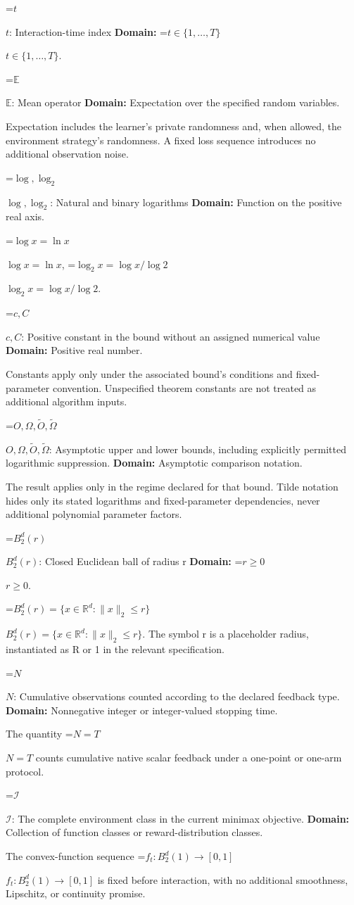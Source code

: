 \documentclass[10pt,a4paper]{article}
\newcommand{\AtlasMath}[1]{\par\begingroup\centering\setbox0=\hbox{$\displaystyle #1$}\ifdim\wd0>1.4\linewidth\typeout{ATLAS WIDE FORMULA: \the\wd0}\fi\ifdim\wd0>\linewidth\resizebox{\linewidth}{!}{\box0}\else\box0\fi\par\endgroup}
\newcommand{\AtlasInlineMath}[1]{\begingroup\setbox0=\hbox{$#1$}\ifdim\wd0>.4\linewidth\endgroup\AtlasMath{#1}\else\endgroup$#1$\fi}
\begin{document}
\AtlasInlineMath{t}: Interaction-time index \textbf{Domain:} \AtlasInlineMath{t\in\{1,\ldots,T\}}.

\AtlasInlineMath{\mathbb E}: Mean operator \textbf{Domain:} Expectation over the specified random variables.

Expectation includes the learner's private randomness and, when allowed, the environment strategy's randomness. A fixed loss sequence introduces no additional observation noise.

\AtlasInlineMath{\log,\log_2}: Natural and binary logarithms \textbf{Domain:} Function on the positive real axis.

\AtlasInlineMath{\log x=\ln x}, \AtlasInlineMath{\log_2x=\log x/\log2}.

\AtlasInlineMath{c,C}: Positive constant in the bound without an assigned numerical value \textbf{Domain:} Positive real number.

Constants apply only under the associated bound’s conditions and fixed-parameter convention. Unspecified theorem constants are not treated as additional algorithm inputs.

\AtlasInlineMath{O,\Omega,\widetilde O,\widetilde\Omega}: Asymptotic upper and lower bounds, including explicitly permitted logarithmic suppression. \textbf{Domain:} Asymptotic comparison notation.

The result applies only in the regime declared for that bound. Tilde notation hides only its stated logarithms and fixed-parameter dependencies, never additional polynomial parameter factors.

\AtlasInlineMath{B_2^d(r)}: Closed Euclidean ball of radius r \textbf{Domain:} \AtlasInlineMath{r\ge0}.

\AtlasInlineMath{B_2^d(r)=\{x\in\mathbb R^d:\|x\|_2\le r\}}. The symbol r is a placeholder radius, instantiated as R or 1 in the relevant specification.

\AtlasInlineMath{N}: Cumulative observations counted according to the declared feedback type. \textbf{Domain:} Nonnegative integer or integer-valued stopping time.

The quantity \AtlasInlineMath{N=T} counts cumulative native scalar feedback under a one-point or one-arm protocol.

\AtlasInlineMath{\mathcal I}: The complete environment class in the current minimax objective. \textbf{Domain:} Collection of function classes or reward-distribution classes.

The convex-function sequence \AtlasInlineMath{f_t:B_2^d(1)\to[0,1]} is fixed before interaction, with no additional smoothness, Lipschitz, or continuity promise.
\end{document}

